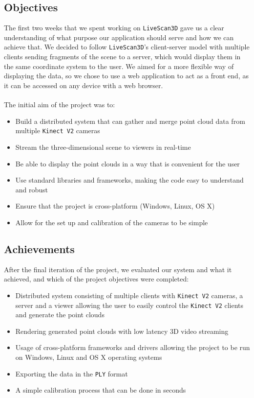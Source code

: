 \documentclass{article}
\begin{document}
\subsection{Objectives}
The first two weeks that we spent working on \texttt{LiveScan3D} \cite{livescan} gave us a clear understanding of what purpose our application should serve and how we can achieve that. We decided to follow \texttt{LiveScan3D}'s \cite{livescan} client-server model with multiple clients sending fragments of the scene to a server, which would display them in the same coordinate system to the user. We aimed for a more flexible way of displaying the data, so we chose to use a web application to act as a front end, as it can be accessed on any device with a web browser.
\\\\
The initial aim of the project was to:
\begin{itemize}
  \item Build a distributed system that can gather and merge point cloud data from multiple \texttt{Kinect V2} cameras
  \item Stream the three-dimensional scene to viewers in real-time
  \item Be able to display the point clouds in a way that is convenient for the user
  \item Use standard libraries and frameworks, making the code easy to understand and robust
  \item Ensure that the project is cross-platform (Windows, Linux, OS X)
  \item Allow for the set up and calibration of the cameras to be simple
\end{itemize}

\subsection{Achievements}
After the final iteration of the project, we evaluated our system and what it achieved, and which of the project objectives were completed:
\begin{itemize}
  \item Distributed system consisting of multiple clients with \texttt{Kinect V2} cameras, a server and a viewer allowing the user to easily control the \texttt{Kinect V2} clients and generate the point clouds
  \item Rendering generated point clouds with low latency 3D video streaming
  \item Usage of cross-platform frameworks and drivers allowing the project to be run on Windows, Linux and OS X operating systems
  \item Exporting the data in the \texttt{PLY} format
  \item A simple calibration process that can be done in seconds
\end{itemize}
\end{document}
